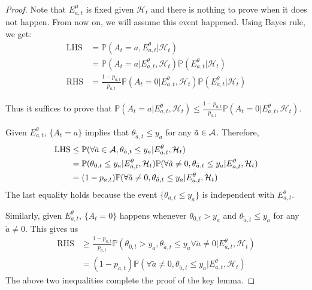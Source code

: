 \documentclass[11pt]{article}
\begin{document}
\begin{proof}
    Note that $E^\mu_{a, t}$ is fixed given $\mathcal{H}_t$ and there is nothing to prove when it does not happen. From now on, we will assume this event happened. Using Bayes rule, we get:
    \begin{align*}
        \text{LHS} &= \mathbb{P}(A_t = a, E^\theta_{a, t} | \mathcal{H}_t) \\
        &= \mathbb{P}(A_t = a | E^\theta_{a, t}, \mathcal{H}_t) \mathbb{P}(E^\theta_{a, t} | \mathcal{H}_t) \\
        \text{RHS} &= \frac{1 - p_{a, t}}{p_{a, t}} \mathbb{P}(A_t = 0| E^\theta_{a, t}, \mathcal{H}_t) \mathbb{P}(E^\theta_{a, t} | \mathcal{H}_t)
    \end{align*}
    
    Thus it suffices to prove that $\mathbb{P}(A_t = a | E^\theta_{a, t}, \mathcal{H}_t) \leq \frac{1 - p_{a, t}}{p_{a, t}} \mathbb{P}(A_t = 0| E^\theta_{a, t}, \mathcal{H}_t)$. 
    
    Given $E^\theta_{a, t}$, $\{A_t = a\}$ implies that $\theta_{\tilde{a}, t} \leq y_a$ for any $\tilde{a} \in \mathcal{A}$. Therefore, 
    \begin{align*}
        \text{LHS} &\leq \mathbb{P}(\forall \tilde{a}\in \mathcal{A}, \theta_{\tilde{a}, t} \leq y_a | E^\theta_{a, t}, \mathcal{H}_t) \\ 
        &= \mathbb{P}(\theta_{0, t} \leq y_a | E^\theta_{a, t}, \mathcal{H}_t)\mathbb{P}(\forall \tilde{a} \neq 0, \theta_{\tilde{a}, t} \leq y_a | E^\theta_{a, t}, \mathcal{H}_t) \\
        &= (1 - p_{a, t})\mathbb{P}(\forall \tilde{a} \neq 0, \theta_{\tilde{a}, t} \leq y_a | E^\theta_{a, t}, \mathcal{H}_t)
    \end{align*}
    The last equality holds because the event $\{\theta_{a, t} \leq y_a\}$ is independent with $E^\theta_{a, t}$. 
    
    Similarly, given $E^\theta_{a, t}$, $\{A_t = 0\}$ happens whenever $\theta_{0, t} > y_a$ and $\theta_{\tilde{a}, t} \leq y_a$ for any $\tilde{a} \neq 0$. This gives us
    \begin{align*}
        \text{RHS} &\geq \frac{1 - p_{a, t}}{p_{a, t}} \mathbb{P}(\theta_{0, t} > y_a, \theta_{\tilde{a}, t} \leq y_a \forall \tilde{a} \neq 0 | E^\theta_{a, t}, \mathcal{H}_t) \\
        &= (1- p_{a, t}) \mathbb{P}(\forall \tilde{a} \neq 0, \theta_{\tilde{a}, t} \leq y_a | E^\theta_{a, t}, \mathcal{H}_t)
    \end{align*}
    The above two inequalities complete the proof of the key lemma.
\end{proof}
		
\end{document}
